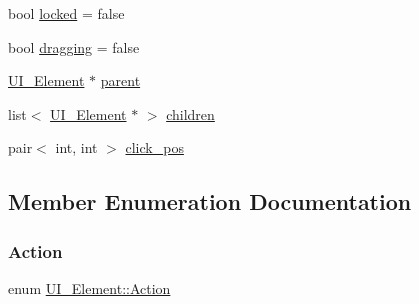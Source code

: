 \begin{DoxyCompactItemize}
bool \mbox{\hyperlink{class_u_i___element_abadfcba029a7bf8d9c0463c4803f9c36}{locked}} = false
\item 
bool \mbox{\hyperlink{class_u_i___element_a7a889ccdc3ba79a8542d64fa60f6aaa2}{dragging}} = false
\item 
\mbox{\hyperlink{class_u_i___element}{U\+I\+\_\+\+Element}} $\ast$ \mbox{\hyperlink{class_u_i___element_a3e9ec27fe0cc3d30c351a9405733439f}{parent}}
\item 
list$<$ \mbox{\hyperlink{class_u_i___element}{U\+I\+\_\+\+Element}} $\ast$ $>$ \mbox{\hyperlink{class_u_i___element_a5630a07d31524e06d15aae288c4fbb1f}{children}}
\item 
pair$<$ int, int $>$ \mbox{\hyperlink{class_u_i___element_afe2217f1c77e887e24844af36c2ccfc8}{click\+\_\+pos}}
\end{DoxyCompactItemize}


\subsection{Member Enumeration Documentation}
\mbox{\label{class_u_i___element_ae179047d98a379f4e0dcdf0871c7b8d6}} 
\subsubsection{\texorpdfstring{Action}{Action}}
{\footnotesize\ttfamily enum \mbox{\hyperlink{class_u_i___element_ae179047d98a379f4e0dcdf0871c7b8d6}{U\+I\+\_\+\+Element\+::\+Action}}}

